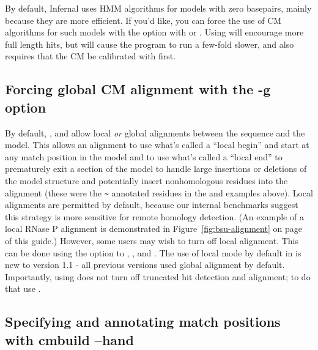 By default, Infernal uses HMM algorithms for models with zero
basepairs, mainly because they are more efficient. If you'd like, you
can force the use of CM algorithms for such models with the
 option with  or . Using
 will encourage more full length hits, but will
cause the program to run a few-fold slower, and also requires that the
CM be calibrated with  first.

\subsection{Forcing global CM alignment with the -g option}

By default, ,  and  allow
local \emph{or} global alignments between the sequence and the
model. This allows an alignment to use what's called a ``local begin''
and start at any match position in the model and to use what's called
a ``local end'' to prematurely exit a section of the model to handle
large insertions or deletions of the model structure and potentially
insert nonhomologous residues into the alignment (these were the
\verb+~+ annotated residues in the  and 
examples above). Local alignments are permitted by default, because
our internal benchmarks suggest this strategy is more sensitive for
remote homology detection. (An example of a local RNase P alignment is
demonstrated in Figure~\ref{fig:bsu-alignment} on
page~\pageref{fig:bsu-alignment} of this guide.)
However, some users may wish to turn off local alignment. This can be
done using the  option to , ,
and . The use of local mode by default in 
is new to version 1.1 - all previous versions used global alignment by
default. Importantly, using  does not turn off truncated hit
detection and alignment; to do that use .

\subsection{Specifying and annotating match positions with cmbuild --hand}

